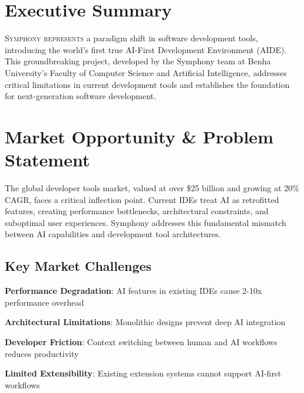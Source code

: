 
\section*{Executive Summary}

\lettrine{S}{ymphony represents} a paradigm shift in software development tools, introducing the world's first true AI-First Development Environment (AIDE). This groundbreaking project, developed by the Symphony team at Benha University's Faculty of Computer Science and Artificial Intelligence, addresses critical limitations in current development tools and establishes the foundation for next-generation software development.

\section*{Market Opportunity \& Problem Statement}

\begin{infobox}[title=Market Context]
The global developer tools market, valued at over \$25 billion and growing at 20\% CAGR, faces a critical inflection point. Current IDEs treat AI as retrofitted features, creating performance bottlenecks, architectural constraints, and suboptimal user experiences. Symphony addresses this fundamental mismatch between AI capabilities and development tool architectures.
\end{infobox}

\subsection*{Key Market Challenges}
\begin{compactlist}
    \item \textbf{Performance Degradation}: AI features in existing IDEs cause 2-10x performance overhead
    \item \textbf{Architectural Limitations}: Monolithic designs prevent deep AI integration
    \item \textbf{Developer Friction}: Context switching between human and AI workflows reduces productivity
    \item \textbf{Limited Extensibility}: Existing extension systems cannot support AI-first workflows
\end{compactlist}

